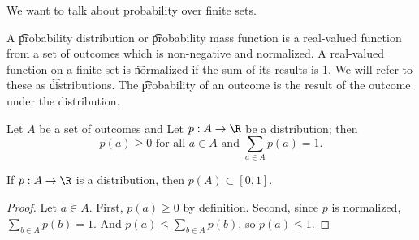 

We want to talk about probability over finite sets.


A \t{probability distribution} or \t{probability mass function} is a real-valued function from a set of outcomes which is non-negative and normalized.
A real-valued function on a finite set is \t{normalized} if the sum of its results is 1.
We will refer to these as \t{distributions}.
The \t{probability of an outcome} is the result of the outcome under the distribution.


Let $A$ be a set of outcomes and
Let $p: A \to \R$ be a distribution; then
\[
  p(a) \geq 0 \text{ for all } a \in A \text{ and } \sum_{a \in A} p(a) = 1.
\]

\begin{prop}
If $p: A \to \R$ is a distribution, then $p(A) \subset [0, 1]$.
\begin{proof}

Let $a \in A$.
First, $p(a) \geq 0$ by definition.
Second, since $p$ is normalized, $\sum_{b \in A} p(b) = 1$.
And $p(a) \leq \sum_{b \in A} p(b)$, so $p(a) \leq 1$.

\end{proof}

\end{prop}

\blankpage
